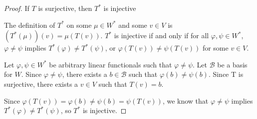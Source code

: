 \begin{proof} If $T$ is surjective, then $T^*$ is injective \gap

    The definition of $T^*$ on some $\mu \in W^*$ 
    and some $v \in V$ is
    $(T^*(\mu))(v) = \mu(T(v))$.
    $T^*$ is injective if and only if for all $\varphi,\psi \in W^*$,
    $\varphi \neq \psi$ implies $T^*(\varphi) \neq T^*(\psi)$, or 
    $\varphi(T(v)) \neq \psi(T(v))$ for some $v \in V$.\gap

    Let $\varphi,\psi \in W^*$ be arbitrary linear functionals 
    such that $\varphi \neq \psi$.
    Let $\mathcal{B}$ be a basis for $W$.
    Since $\varphi \neq \psi$, 
    there exists a $b \in \mathcal{B}$ such that
    $\varphi(b) \neq \psi(b)$.
    Since T is surjective,
    there exists a $v \in V$ such that
    $T(v) = b$.\gap

    Since $\varphi(T(v)) = \varphi(b) \neq \psi(b) = \psi(T(v))$,
    we know that $\varphi \neq \psi$ implies $T^*(\varphi) \neq T^*(\psi)$,
    so $T^*$ is injective.
\end{proof}